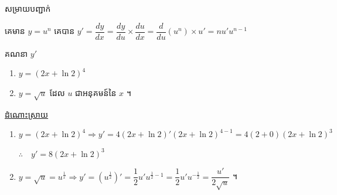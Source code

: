 \documentclass[12pt,fleqn]{book} %
\newcommand{\answer}{\begin{center}
\kml \color{blue} \underline{ដំណោះស្រាយ}
\end{center}}
\newcommand{\solution}{{\begin{center}\kml \color{blue} សម្រាយបញ្ជាក់\end{center} }}
\begin{document}
\solution
គេមាន $y=u^n$ គេបាន $y'=\dfrac{dy}{dx}=\dfrac{dy}{du}\times \dfrac{du}{dx}=\dfrac{d}{du}(u^n)\times u'=nu'u^{n-1}$ 
\begin{example}
គណនា $y'$ 
\begin{multicols}{2}
\begin{enumerate}
\item $y=(2x+\ln 2)^4$
\item $y=\sqrt{u}$ ដែល $u$ ជាអនុគមន៍នៃ $x$ ។
\end{enumerate}
\end{multicols}
\end{example}
\answer
\begin{enumerate}

\item $y=(2x+\ln 2)^4\Longrightarrow y'=4(2x+\ln 2)'(2x+\ln 2)^{4-1}=4(2+0)(2x+\ln 2)^3$
\begin{center}
$\therefore \quad y'=8(2x+\ln 2)^3$
\end{center}
\item $y=\sqrt{u}=u^{\frac{1}{x}} \Longrightarrow y'=(u^{\frac{1}{2}})'=\dfrac{1}{2}u'u^{\frac{1}{2}-1}=\dfrac{1}{2}u'u^{-\frac{1}{2}}=\dfrac{u'}{2\sqrt{u}}$ ។ 
\end{enumerate}
\end{document}
